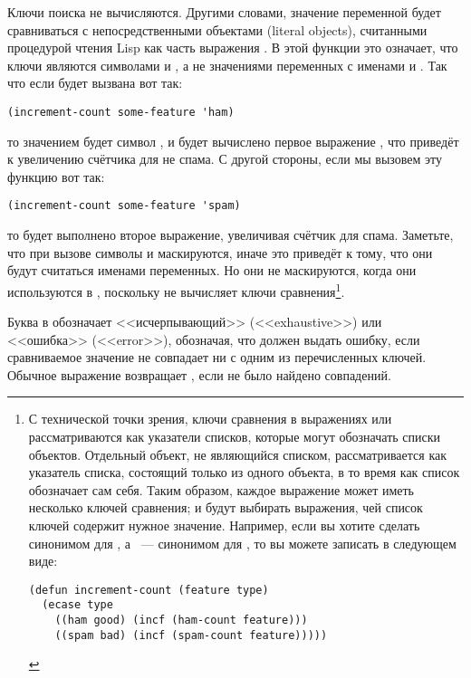 Ключи поиска не вычисляются.  Другими словами, значение переменной  будет
сравниваться с непосредственными объектами (literal objects), считанными процедурой чтения
Lisp как часть выражения . В этой функции это означает, что ключи являются
символами  и , а не значениями переменных с именами  и
.  Так что если  будет вызвана вот так:
\begin{lstlisting}
(increment-count some-feature 'ham)
\end{lstlisting}
то значением  будет символ , и будет вычислено первое выражение
, что приведёт к увеличению счётчика для не спама. С другой стороны, если мы
вызовем эту функцию вот так:
\begin{lstlisting}
(increment-count some-feature 'spam)
\end{lstlisting}
то будет выполнено второе выражение, увеличивая счётчик для спама.  Заметьте, что при
вызове  символы  и  маскируются, иначе это
приведёт к тому, что они будут считаться именами переменных.  Но они не маскируются, когда
они используются в , поскольку  не вычисляет ключи
сравнения\footnote{С технической точки зрения, ключи сравнения в выражениях 
  или  рассматриваются как указатели списков, которые могут обозначать списки
  объектов.  Отдельный объект, не являющийся списком, рассматривается как указатель
  списка, состоящий только из одного объекта, в то время как список обозначает сам себя.
  Таким образом, каждое выражение может иметь несколько ключей сравнения;  и
   будут выбирать выражения, чей список ключей содержит нужное значение.
  Например, если вы хотите сделать  синонимом для , а ~---
  синонимом для , то вы можете записать  в следующем
  виде:

\begin{lstlisting}
(defun increment-count (feature type)
  (ecase type
    ((ham good) (incf (ham-count feature)))
    ((spam bad) (incf (spam-count feature)))))
\end{lstlisting}
}.

Буква  в  обозначает <<исчерпывающий>> (<<exhaustive>>) или
<<ошибка>> (<<error>>), обозначая, что  должен выдать ошибку, если сравниваемое
значение не совпадает ни с одним из перечисленных ключей.  Обычное выражение 
возвращает , если не было найдено совпадений.

